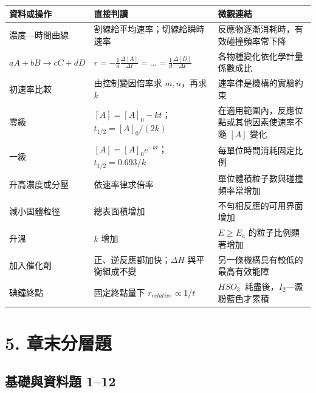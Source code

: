 \documentclass[11pt,a4paper]{article}
\newcounter{none}
\begin{document}
{\def\LTcaptype{none} %
\begin{longtable}[]{@{}
  >{\raggedright\arraybackslash}p{}
  >{\raggedright\arraybackslash}p{}
  >{\raggedright\arraybackslash}p{}@{}}
\toprule\noalign{}
\begin{minipage}[b]{\linewidth}\raggedright
資料或操作
\end{minipage} & \begin{minipage}[b]{\linewidth}\raggedright
直接判讀
\end{minipage} & \begin{minipage}[b]{\linewidth}\raggedright
微觀連結
\end{minipage} \\
\midrule\noalign{}
\endhead
\bottomrule\noalign{}
\endlastfoot
濃度---時間曲線 & 割線給平均速率；切線給瞬時速率 & 反應物逐漸消耗時，有效碰撞頻率常下降 \\
\(aA+bB\rightarrow cC+dD\) & \(r=-\frac1a\frac{\Delta[A]}{\Delta t}=…=\frac1d\frac{\Delta[D]}{\Delta t}\) & 各物種變化依化學計量係數成比 \\
初速率比較 & 由控制變因倍率求 \(m,n\)，再求 \(k\) & 速率律是機構的實驗約束 \\
零級 & \([A]=[A]_0-kt\)；\(t_{1/2}=[A]_0/(2k)\) & 在適用範圍內，反應位點或其他因素使速率不隨 \([A]\) 變化 \\
一級 & \([A]=[A]_0e^{-kt}\)；\(t_{1/2}=0.693/k\) & 每單位時間消耗固定比例 \\
升高濃度或分壓 & 依速率律求倍率 & 單位體積粒子數與碰撞頻率常增加 \\
減小固體粒徑 & 總表面積增加 & 不勻相反應的可用界面增加 \\
升溫 & \(k\) 增加 & \(E\ge E_a\) 的粒子比例顯著增加 \\
加入催化劑 & 正、逆反應都加快；\(\Delta H\) 與平衡組成不變 & 另一條機構具有較低的最高有效能障 \\
碘鐘終點 & 固定終點量下 \(r_{relative}\propto1/t\) & \(HSO_3^-\) 耗盡後，\(I_2\)---澱粉藍色才累積 \\
\end{longtable}
}

\section{5. 章末分層題}\label{ux7ae0ux672bux5206ux5c64ux984c}

\subsection{基礎與資料題 1--12}\label{ux57faux790eux8207ux8cc7ux6599ux984c-112}
\end{document}
